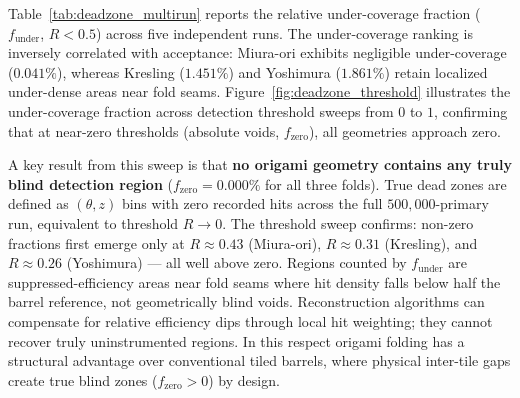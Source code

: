 \documentclass[a4paper,11pt]{article}
\begin{document}
Table~\ref{tab:deadzone_multirun} reports the relative under-coverage fraction ($f_{\text{under}}$, $R < 0.5$) across five independent runs. The under-coverage ranking is inversely correlated with acceptance: Miura-ori exhibits negligible under-coverage ($0.041\%$), whereas Kresling ($1.451\%$) and Yoshimura ($1.861\%$) retain localized under-dense areas near fold seams. Figure~\ref{fig:deadzone_threshold} illustrates the under-coverage fraction across detection threshold sweeps from $0$ to $1$, confirming that at near-zero thresholds (absolute voids, $f_{\text{zero}}$), all geometries approach zero.

A key result from this sweep is that \textbf{no origami geometry contains any truly blind detection region} ($f_{\text{zero}} = 0.000\%$ for all three folds). True dead zones are defined as $({\theta}, z)$ bins with zero recorded hits across the full $500{,}000$-primary run, equivalent to threshold $R \to 0$. The threshold sweep confirms: non-zero fractions first emerge only at $R \approx 0.43$ (Miura-ori), $R \approx 0.31$ (Kresling), and $R \approx 0.26$ (Yoshimura) --- all well above zero. Regions counted by $f_{\text{under}}$ are suppressed-efficiency areas near fold seams where hit density falls below half the barrel reference, not geometrically blind voids. Reconstruction algorithms can compensate for relative efficiency dips through local hit weighting; they cannot recover truly uninstrumented regions. In this respect origami folding has a structural advantage over conventional tiled barrels, where physical inter-tile gaps create true blind zones ($f_{\text{zero}} > 0$) by design.

\begin{table}[!htbp]
\centering
\caption{Relative under-coverage fraction ($f_{\text{under}}$, $R < 0.5$) across five replication runs per fold geometry.}
\label{tab:deadzone_multirun}
\smallskip
{}
\end{table}
\end{document}
